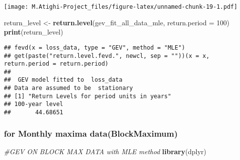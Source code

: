 \documentclass[
  12pt,
]{article}
\newenvironment{Shaded}{\begin{snugshade}}{\end{snugshade}}
\newcommand{\AttributeTok}[1]{\textcolor[rgb]{0.13,0.29,0.53}{#1}}
\newcommand{\CommentTok}[1]{\textcolor[rgb]{0.56,0.35,0.01}{\textit{#1}}}
\newcommand{\DecValTok}[1]{\textcolor[rgb]{0.00,0.00,0.81}{#1}}
\newcommand{\FunctionTok}[1]{\textcolor[rgb]{0.13,0.29,0.53}{\textbf{#1}}}
\newcommand{\NormalTok}[1]{#1}
\newcommand{\OtherTok}[1]{\textcolor[rgb]{0.56,0.35,0.01}{#1}}
\newcommand{\SpecialCharTok}[1]{\textcolor[rgb]{0.81,0.36,0.00}{\textbf{#1}}}
\newcommand{\StringTok}[1]{\textcolor[rgb]{0.31,0.60,0.02}{#1}}
\begin{document}
\texttt{[image: M.Atighi-Project\_files/figure-latex/unnamed-chunk-19-1.pdf]}

\begin{Shaded}
\begin{Highlighting}[]
\NormalTok{return\_level }\OtherTok{\textless{}{-}} \FunctionTok{return.level}\NormalTok{(gev\_fit\_all\_data\_mle, }\AttributeTok{return.period =} \DecValTok{100}\NormalTok{)}
\FunctionTok{print}\NormalTok{(return\_level)}
\end{Highlighting}
\end{Shaded}

\begin{verbatim}
## fevd(x = loss_data, type = "GEV", method = "MLE")
## get(paste("return.level.fevd.", newcl, sep = ""))(x = x, return.period = return.period)
## 
##  GEV model fitted to  loss_data  
## Data are assumed to be  stationary 
## [1] "Return Levels for period units in years"
## 100-year level 
##       44.68651
\end{verbatim}

\subsubsection{for Monthly maxima
data(BlockMaximum)}\label{for-monthly-maxima-datablockmaximum}

\begin{Shaded}
\begin{Highlighting}[]
\CommentTok{\#GEV ON BLOCK MAX DATA with MLE method}
\FunctionTok{library}\NormalTok{(dplyr)}
\end{Highlighting}
\end{Shaded}

\begin{Shaded}
\end{Shaded}
\end{document}
